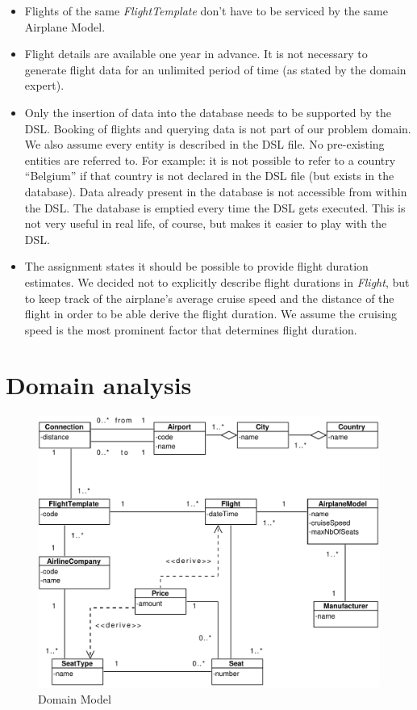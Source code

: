 \documentclass[a4paper]{article}
\newcommand{\field}[1]{\emph{#1}}
\begin{document}
\begin{itemize}
\item Flights of the same \field{FlightTemplate} don't have to be serviced by the same Airplane Model.

\item Flight details are available one year in advance. It is not necessary to generate flight data for an unlimited period of time (as stated by the domain expert).

\item Only the insertion of data into the database needs to be supported by the DSL.
Booking of flights and querying data is not part of our problem domain.
We also assume every entity is described in the DSL file.
No pre-existing entities are referred to.
For example: it is not possible to refer to a country ``Belgium'' if that country is not declared in the DSL file (but exists in the database).
Data already present in the database is not accessible from within the DSL\@.
The database is emptied every time the DSL gets executed.
This is not very useful in real life, of course, but makes it easier to play with the DSL.

\item The assignment states it should be possible to provide flight duration estimates.
We decided not to explicitly describe flight durations in \field{Flight}, but to keep track of the airplane's average cruise speed and the distance of the flight in order to be able derive the flight duration.
We assume the cruising speed is the most prominent factor that determines flight duration.


\end{itemize}
\clearpage
\section{Domain analysis}
\label{sec:domain-analysis}

\begin{figure}[ht!]
  \includegraphics[width=1.0\textwidth]{../analysis/domainModel.pdf}
  \caption{Domain Model}\label{fig:domain-model}
\end{figure}
\end{document}
